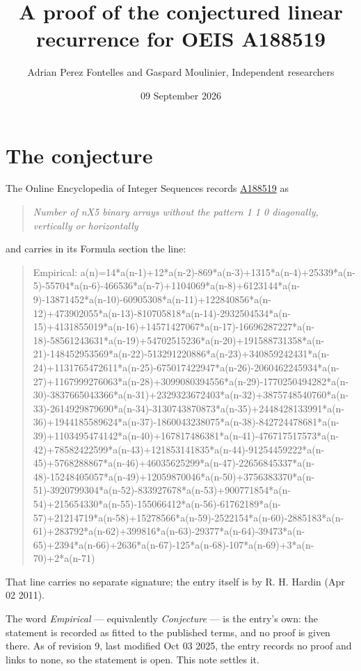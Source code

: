 \documentclass[11pt]{article}
\title{A proof of the conjectured linear recurrence for OEIS A188519}
\author{Adrian Perez Fontelles and Gaspard Moulinier, Independent researchers}
\date{09 September 2026}
\theoremstyle{definition}
\begin{document}
\maketitle
\section{The conjecture}

The Online Encyclopedia of Integer Sequences records \href{https://oeis.org/A188519}{A188519} as

\begin{quote}\itshape Number of nX5 binary arrays without the pattern 1 1 0 diagonally, vertically or horizontally\end{quote}

and carries in its Formula section the line:

\begin{quote}\ttfamily Empirical: a(n)=14*a(n-1)+12*a(n-2)-869*a(n-3)+1315*a(n-4)+25339*a(n-5)-55704*a(n-6)-466536*a(n-7)+1104069*a(n-8)+6123144*a(n-9)-13871452*a(n-10)-60905308*a(n-11)+122840856*a(n-12)+473902055*a(n-13)-810705818*a(n-14)-2932504534*a(n-15)+4131855019*a(n-16)+14571427067*a(n-17)-16696287227*a(n-18)-58561243631*a(n-19)+54702515236*a(n-20)+191588731358*a(n-21)-148452953569*a(n-22)-513291220886*a(n-23)+340859242431*a(n-24)+1131765472611*a(n-25)-675017422947*a(n-26)-2060462245934*a(n-27)+1167999276063*a(n-28)+3099080394556*a(n-29)-1770250494282*a(n-30)-3837665043366*a(n-31)+2329323672403*a(n-32)+3875748540760*a(n-33)-2614929879690*a(n-34)-3130743870873*a(n-35)+2448428133991*a(n-36)+1944185589624*a(n-37)-1860043238075*a(n-38)-842724478681*a(n-39)+1103495474142*a(n-40)+167817486381*a(n-41)-476717517573*a(n-42)+78582422599*a(n-43)+121853141835*a(n-44)-91254459222*a(n-45)+5768288867*a(n-46)+46035625299*a(n-47)-22656845337*a(n-48)-15248405057*a(n-49)+12059870046*a(n-50)+3756383370*a(n-51)-3920799304*a(n-52)-833927678*a(n-53)+900771854*a(n-54)+215654330*a(n-55)-155066412*a(n-56)-61762189*a(n-57)+21214719*a(n-58)+15278566*a(n-59)-2522154*a(n-60)-2885183*a(n-61)+283792*a(n-62)+399816*a(n-63)-29377*a(n-64)-39473*a(n-65)+2394*a(n-66)+2636*a(n-67)-125*a(n-68)-107*a(n-69)+3*a(n-70)+2*a(n-71)\end{quote}

That line carries no separate signature; the entry itself is by R. H. Hardin (Apr 02 2011).

The word {\itshape Empirical} --- equivalently {\itshape Conjecture} --- is the entry's own: the statement is recorded as fitted to the published terms, and no proof is given there. As of revision 9, last modified Oct 03 2025, the entry records no proof and links to none, so the statement is open. This note settles it.
\end{document}
